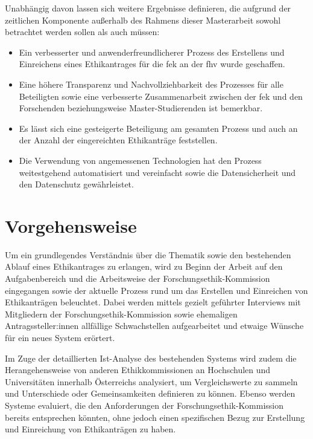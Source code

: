 \documentclass[a4paper,12pt,twoside]{scrreprt}
\begin{document}
\medskip

Unabhängig davon lassen sich weitere Ergebnisse definieren, die aufgrund der zeitlichen Komponente außerhalb des Rahmens dieser Masterarbeit sowohl betrachtet werden sollen als auch müssen:
\begin{itemize}
    \item Ein verbesserter und anwenderfreundlicherer Prozess des Erstellens und Einreichens eines Ethikantrages für die \acl{fek} an der \acl{fhv} wurde geschaffen.
    \item Eine höhere Transparenz und Nachvollziehbarkeit des Prozesses für alle Beteiligten sowie eine verbesserte Zusammenarbeit zwischen der \acl{fek} und den Forschenden beziehungsweise Master-Studierenden ist bemerkbar.
    \item Es lässt sich eine gesteigerte Beteiligung am gesamten Prozess und auch an der Anzahl der eingereichten Ethikanträge feststellen.
    \item Die Verwendung von angemessenen Technologien hat den Prozess weitestgehend automatisiert und vereinfacht sowie die Datensicherheit und den Datenschutz gewährleistet.
\end{itemize}

\section{Vorgehensweise}
\label{sec:vorgehensweise}

Um ein grundlegendes Verständnis über die Thematik sowie den bestehenden Ablauf eines Ethikantrages zu erlangen, wird zu Beginn der Arbeit auf den Aufgabenbereich und die Arbeitsweise der Forschungsethik-Kommission eingegangen sowie der aktuelle Prozess rund um das Erstellen und Einreichen von Ethikanträgen beleuchtet. Dabei werden mittels gezielt geführter Interviews mit Mitgliedern der Forschungsethik-Kommission sowie ehemaligen Antragssteller:innen allfällige Schwachstellen aufgearbeitet und etwaige Wünsche für ein neues System erörtert.

Im Zuge der detaillierten Ist-Analyse des bestehenden Systems wird zudem die Herangehensweise von anderen Ethikkommissionen an Hochschulen und Universitäten innerhalb Österreichs analysiert, um Vergleichswerte zu sammeln und Unterschiede oder Gemeinsamkeiten definieren zu können. Ebenso werden Systeme evaluiert, die den Anforderungen der Forschungsethik-Kommission bereits entsprechen könnten, ohne jedoch einen spezifischen Bezug zur Erstellung und Einreichung von Ethikanträgen zu haben.
\end{document}
